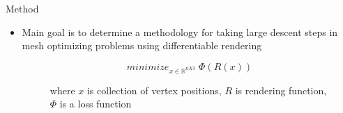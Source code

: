 \documentclass[beamer]{standalone}
\begin{document}
\begin{frame}{Method}
    \begin{itemize}
    \item Main goal is to determine a methodology 
    for taking large descent steps in mesh optimizing problems 
    using differentiable rendering
    \begin{figure}
        \begin{equation}
            minimize_{x\in\mathbb{R}^{nX3}}  \; \Phi(R(x))
        \end{equation}
    \caption{where $x$ is collection of vertex positions, $R$ is rendering function, $\Phi$ is a loss function}
    \end{figure}
\end{itemize}

\end{frame}
\end{document}
